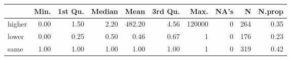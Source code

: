 \begin{table}[ht]
\centering
\begin{tabular}{lrrrrrrrrr}
  \hline
 & Min. & 1st Qu. & Median & Mean & 3rd Qu. & Max. & NA's & N & N.prop \\ 
  \hline
higher & 0.00 & 1.50 & 2.20 & 482.20 & 4.56 & 120000 &   0 & 264 & 0.35 \\ 
  lower & 0.00 & 0.25 & 0.50 & 0.46 & 0.67 &   1 &   0 & 176 & 0.23 \\ 
  same & 1.00 & 1.00 & 1.00 & 1.00 & 1.00 &   1 &   0 & 319 & 0.42 \\ 
   \hline
\end{tabular}
\end{table}
